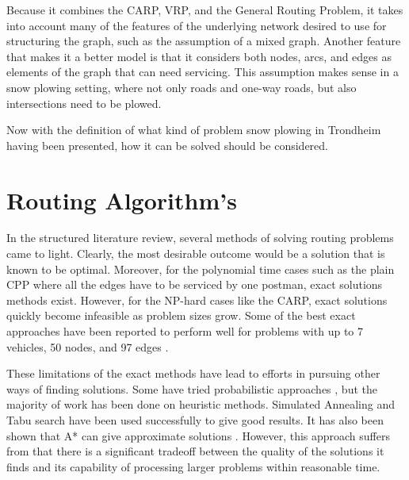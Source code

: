 Because it combines the CARP, VRP, and the General Routing Problem, it takes into account many of the features of the underlying network desired to use for structuring the graph, such as the assumption of a mixed graph. Another feature that makes it a better model is that it considers both nodes, arcs, and edges as elements of the graph that can need servicing. This assumption makes sense in a snow plowing setting, where not only roads and one-way roads, but also intersections need to be plowed.

Now with the definition of what kind of problem snow plowing in Trondheim having been presented, how it can be solved should be considered.




\section{Routing Algorithm's} %
\label{sec:routing_algorithms}

In the structured literature review, several methods of solving routing problems came to light. Clearly, the most desirable outcome would be a solution that is known to be optimal. Moreover, for the polynomial time cases such as the plain CPP where all the edges have to be serviced by one postman, exact solutions methods exist. However, for the NP-hard cases like the CARP, exact solutions quickly become infeasible as problem sizes grow. Some of the best exact approaches have been reported to perform well for problems with up to 7 vehicles, 50 nodes, and 97 edges \citep{belenguer2003cutting}.

These limitations of the exact methods have lead to efforts in pursuing other ways of finding solutions. Some have tried probabilistic approaches \citep{christiansen2009branch}, but the majority of work has been done on heuristic methods. Simulated Annealing \citep{eglese1994simulatedAnnealing} and Tabu search \citep{brandao2008tabu} have been used successfully to give good results. It has also been shown that A* can give approximate solutions \citep{rao2011AStar}. However, this approach suffers from that there is a significant tradeoff between the quality of the solutions it finds and its capability of processing larger problems within reasonable time.


